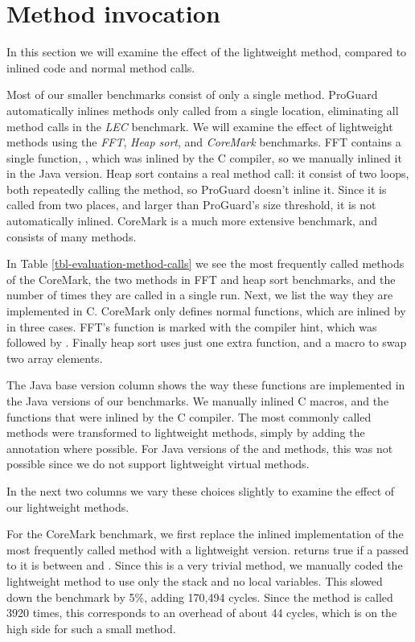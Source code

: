 \section{Method invocation}
\label{sec-evaluation-method-invocation}


In this section we will examine the effect of the lightweight method, compared to inlined code and normal method calls.

Most of our smaller benchmarks consist of only a single method. ProGuard automatically inlines methods only called from a single location, eliminating all method calls in the \emph{LEC} benchmark. We will examine the effect of lightweight methods using the \emph{FFT}, \emph{Heap sort}, and \emph{CoreMark} benchmarks.
FFT contains a single function, , which was inlined by the C compiler, so we manually inlined it in the Java version. Heap sort contains a real method call: it consist of two loops, both repeatedly calling the  method, so ProGuard doesn't inline it. Since it is called from two places, and larger than ProGuard's size threshold, it is not automatically inlined. CoreMark is a much more extensive benchmark, and consists of many methods.

In Table \ref{tbl-evaluation-method-calls} we see the most frequently called methods of the CoreMark, the two methods in FFT and heap sort benchmarks, and the number of times they are called in a single run. Next, we list the way they are implemented in C. CoreMark only defines normal functions, which are inlined by  in three cases. FFT's  function is marked with the  compiler hint, which was followed by . Finally heap sort uses just one extra function, and a macro to swap two array elements.

The Java base version column shows the way these functions are implemented in the Java versions of our benchmarks. We manually inlined C macros, and the functions that were inlined by the C compiler. The most commonly called methods were transformed to lightweight methods, simply by adding the  annotation where possible. For Java versions of the  and  methods, this was not possible since we do not support lightweight virtual methods.

In the next two columns we vary these choices slightly to examine the effect of our lightweight methods.

For the CoreMark benchmark, we first replace the inlined implementation of the most frequently called method with a lightweight version.  returns true if a  passed to it is between  and . Since this is a very trivial method, we manually coded the lightweight method to use only the stack and no local variables. This slowed down the benchmark by 5\%, adding 170,494 cycles. Since the method is called 3920 times, this corresponds to an overhead of about 44 cycles, which is on the high side for such a small method.

